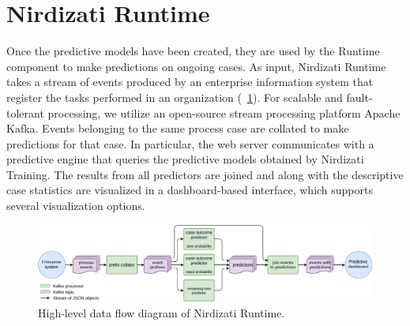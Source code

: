\documentclass[runningheads,a4paper]{llncs}
\begin{document}



\section{Nirdizati Runtime} \label{sec:runtime}
Once the predictive models have been created, they are used by the Runtime component to make predictions on ongoing cases.
As input, Nirdizati Runtime takes a stream of events produced by an enterprise information system that register the tasks performed in an organization (\figurename~\ref{fig:dfd_0}).
For scalable and fault-tolerant processing, we utilize an open-source stream processing platform Apache Kafka.
Events belonging to the same process case are collated to make predictions for that case.
In particular, the web server communicates with a predictive engine that queries the predictive models obtained by Nirdizati Training.
The results from all predictors are joined and along with the descriptive case statistics are visualized in a dashboard-based interface, which supports several visualization options.

\begin{figure}[t]
	\centering
	\includegraphics[width=\textwidth]{img/nirdizati-dataflow}
	\caption{High-level data flow diagram of Nirdizati Runtime.}
	\label{fig:dfd_0}
\end{figure}
\end{document}
